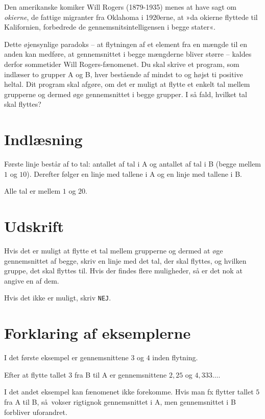 Den amerikanske komiker Will Rogers (1879-1935) menes at have sagt om \emph{okierne}, de fattige migranter fra Oklahoma i 1920erne, at »da okierne  flyttede til Kalifornien, forbedrede de gennemsnitsintelligensen i begge stater«.

Dette øjensynlige paradoks -- at flytningen af et element fra en mængde til en anden kan medføre, at gennemsnittet i begge mængderne bliver større -- kaldes derfor sommetider Will Rogers-fænomenet.
Du skal skrive et program, som indlæser to grupper A og B, hver bestående af mindst to og højst ti positive heltal.
Dit program skal afgøre, om det er muligt at flytte et enkelt tal mellem grupperne og dermed øge gennemsnittet i begge grupper.
I så fald, hvilket tal skal flyttes?

\section*{Indlæsning}

Første linje består af to tal: antallet af tal i A og antallet af tal i B (begge mellem $1$ og $10$).
Derefter følger en linje med tallene i A og en linje med tallene i B.

Alle tal er mellem $1$ og $20$.

\section*{Udskrift}
Hvis det er muligt at flytte et tal mellem grupperne og dermed at øge gennemsnittet af begge, skriv en linje med det tal, der skal flyttes, og hvilken gruppe, det skal flyttes til.
Hvis der findes flere muligheder, så er det nok at angive en af dem.

Hvis det ikke er muligt, skriv \texttt{NEJ}.

\section*{Forklaring af eksemplerne}

I det første eksempel er gennemsnittene $3$ og $4$ inden flytning.

Efter at flytte tallet $3$ fra B til A er gennemsnittene $2{,}25$ og $4{,}333\ldots$.

I det andet eksempel kan fænomenet ikke forekomme.
Hvis man fx flytter tallet $5$ fra A til B, så vokser rigtignok gennemsnittet i A, men gennemsnittet i B forbliver uforandret. 
